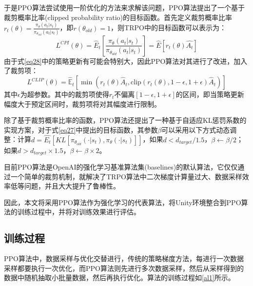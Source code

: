 \documentclass[bachelor]{thesis-uestc}
\begin{document}
	于是PPO算法尝试使用一阶优化的方法来求解该问题，PPO算法提出了一个基于裁剪概率比率(clipped probability ratio)的目标函数。首先定义裁剪概率比率$r_t(\theta)=\frac{\pi_\theta(a_t|s_t)}{\pi_{\theta_{old}}(a_t|s_t)}$，即$r(\theta_{old})=1$，则TRPO中的目标函数可以表示为：
	\begin{equation}
		\label{eq28}
		L^{CPI}(\theta)=\hat{E}_t[\frac{\pi_\theta(a_t|s_t)}{\pi_{\theta_{old}}(a_t|s_t)}]=\hat{E}[r_t(\theta)\hat{A_t}]
	\end{equation}
	由于式\ref{eq28}中的策略更新有可能会特别大，因此PPO算法对其进行了改进，加入了裁剪项：
	\begin{equation}
		\label{eq29}
		L^{CLIP}(\theta) = \hat{\mathbb{E}}_t [\min(r_t(\theta) \hat{A}_t, \text{clip}(r_t(\theta), 1 - \epsilon, 1+\epsilon) \hat{A}_t)]
	\end{equation}
	其中$\epsilon$为超参数。其中的裁剪项使得$r_t$不偏离$[1-\epsilon, 1+\epsilon]$的区间，即当策略更新幅度大于预定区间时，裁剪项将对其幅度进行限制。
	
	除了基于裁剪概率比率的函数，PPO算法还提出了一种基于自适应KL惩罚系数的实现方案，对于式\ref{eq27}中提出的目标函数，其参数$\beta$可以采用以下方式动态调整：计算$d=\hat{E_t}[KL[\pi_{\theta_{old}}(\cdot|s_t), \pi_\theta(\cdot|s_t)]]$，如果$d<d_{target}/1.5$，$\beta\leftarrow\beta/2$；如果$d>d_{target}\times1.5$，$\beta\leftarrow\beta\times2$。
	
	目前PPO算法是OpenAI的强化学习基准算法集(baselines)的默认算法，它仅仅通过一个简单的裁剪机制，就解决了TRPO算法中二次梯度计算量过大、数据采样效率低等问题，并且大大提升了鲁棒性。
	
	因此，本文将采用PPO算法作为强化学习的代表算法，将Unity环境整合到PPO算法的训练过程中，并将对训练效果进行评估。
	
	\subsection{训练过程}
	PPO算法中，数据采样与优化交替进行，传统的策略梯度方法，每进行一次数据采样都要执行一次优化，而PPO算法则先进行多次数据采样，然后从采样得到的数据中随机抽取小批量数据，然后再执行优化。算法的训练过程如\ref{al1}所示。
	
\end{document}
